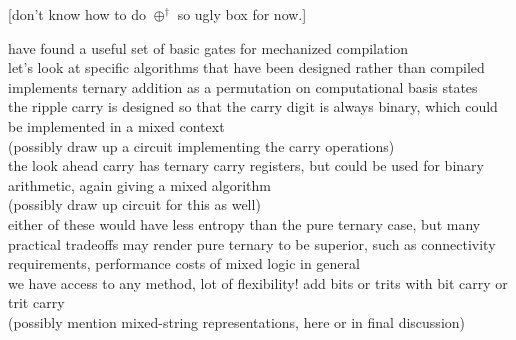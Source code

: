 [don't know how to do $\oplus^\dagger$ so ugly box for now.]

have found a useful set of basic gates for mechanized compilation
\\let's look at specific algorithms that have been designed rather than compiled
\\\cite{arithmetics} implements ternary addition as a permutation on computational basis states
\\the ripple carry is designed so that the carry digit is always binary, which could be implemented in a mixed context
\\(possibly draw up a circuit implementing the carry operations)
\\the look ahead carry has ternary carry registers, but could be used for binary arithmetic, again giving a mixed algorithm
\\(possibly draw up circuit for this as well)
\\either of these would have less entropy than the pure ternary case, but many practical tradeoffs may render pure ternary to be superior, such as connectivity requirements, performance costs of mixed logic in general
\\we have access to any method, lot of flexibility! add bits or trits with bit carry or trit carry
\\(possibly mention mixed-string representations, here or in final discussion)

